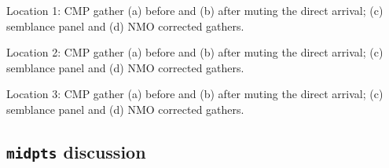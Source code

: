 {Location 1: CMP gather (a) before and (b) after muting the direct
  arrival; (c) semblance panel and (d) NMO corrected gathers.}

{Location 2: CMP gather (a) before and (b) after muting the direct
  arrival; (c) semblance panel and (d) NMO corrected gathers.}

{Location 3: CMP gather (a) before and (b) after muting the direct
  arrival; (c) semblance panel and (d) NMO corrected gathers.}



\pagebreak

\subsection{\texttt{midpts} discussion}

